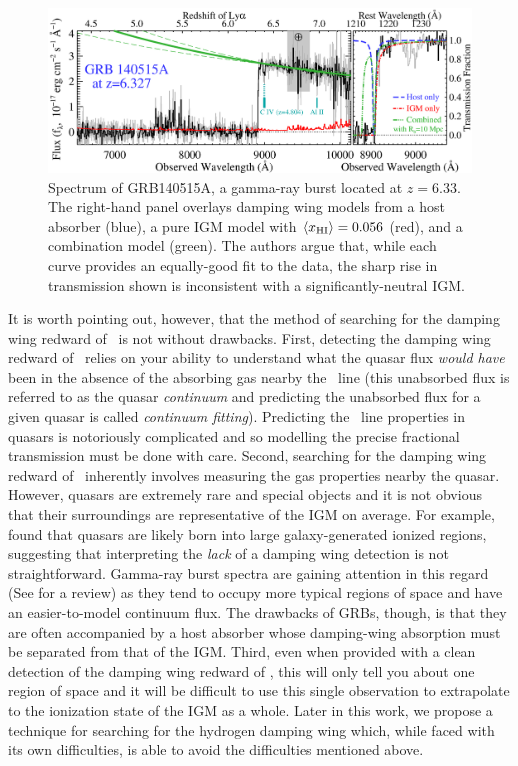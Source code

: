 \begin{figure}[h]
  \centering
  \includegraphics[width=14cm]{GRB140515A.eps}
  \caption{Spectrum of GRB140515A, a gamma-ray burst located at $z = 6.33$. The right-hand panel overlays damping wing models from a host absorber (blue), a pure IGM model with $\langle x_{\text{HI}}\rangle = 0.056$ (red), and a combination model (green). The authors argue that, while each curve provides an equally-good fit to the data, the sharp rise in transmission shown is inconsistent with a significantly-neutral IGM. }
  \label{fig:GRB140515A}
\end{figure}


It is worth pointing out, however, that the method of searching for the damping wing redward of \lya\ is not without drawbacks. First, detecting the damping wing redward of \lya\ relies on your ability to understand what the quasar flux \textit{would have} been in the absence of the absorbing gas nearby the \lya\ line (this unabsorbed flux is referred to as the quasar \textit{continuum} and predicting the unabsorbed flux for a given quasar is called \textit{continuum fitting}). Predicting the \lya\ line properties in quasars is notoriously complicated and so modelling the precise fractional transmission must be done with care. Second, searching for the damping wing redward of \lya\ inherently involves measuring the gas properties nearby the quasar. However, quasars are extremely rare and special objects and it is not obvious that their surroundings are representative of the IGM on average. For example, \cite{Lidz:2007mz} found that quasars are likely born into large galaxy-generated ionized regions, suggesting that interpreting the \textit{lack} of a damping wing detection is not straightforward. Gamma-ray burst spectra are gaining attention in this regard (See \citealt{Salvaterra:2015gpa} for a review) as they tend to occupy more typical regions of space and have an easier-to-model continuum flux. The drawbacks of GRBs, though, is that they are often accompanied by a host absorber whose damping-wing absorption must be separated from that of the IGM. Third, even when provided with a clean detection of the damping wing redward of \lya, this will only tell you about one region of space and it will be difficult to use this single observation to extrapolate to the ionization state of the IGM as a whole. Later in this work, we propose a technique for searching for the hydrogen damping wing which, while faced with its own difficulties, is able to avoid the difficulties mentioned above. 

